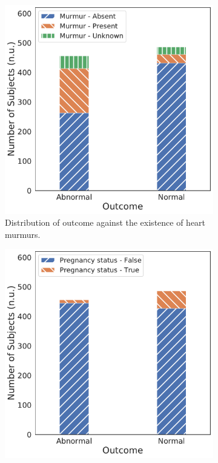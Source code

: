 \begin{figure}[!htp]
\centering
\begin{subfigure}[b]{0.49\linewidth}
    \centering
    \includegraphics[width=\textwidth]{images/outcome_murmur_corr.pdf}
    \caption[]
    {Distribution of outcome against the existence of heart murmurs.}
    \label{fig:outcome_murmur_corr}
\end{subfigure}
\hfill
\begin{subfigure}[b]{0.49\linewidth}
    \centering
    \includegraphics[width=\textwidth]{images/outcome_pregnancy_status_corr.pdf}

\end{subfigure}
\end{figure}
